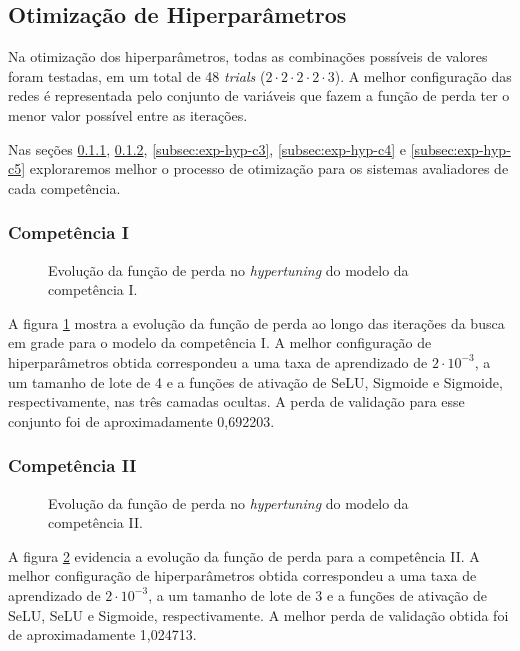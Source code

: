 \subsection{Otimização de Hiperparâmetros}

Na otimização dos hiperparâmetros, todas as combinações possíveis de valores foram testadas, em um total de 48 \textit{trials} ($2 \cdot 2 \cdot 2 \cdot 2 \cdot 3$). A melhor configuração das redes é representada pelo conjunto de variáveis que fazem a função de perda ter o menor valor possível entre as iterações.

Nas seções \ref{subsec:exp-hyp-c1}, \ref{subsec:exp-hyp-c2}, \ref{subsec:exp-hyp-c3}, \ref{subsec:exp-hyp-c4} e \ref{subsec:exp-hyp-c5} exploraremos melhor o processo de otimização para os sistemas avaliadores de cada competência.

\subsubsection{Competência I}
\label{subsec:exp-hyp-c1}

\begin{figure}[H]
    \resizebox{0.5\textwidth}{!}{}
    \caption{Evolução da função de perda no \textit{hypertuning} do modelo da competência I.}
    \label{fig:exp-hyp-c1}
\end{figure}

A figura \ref{fig:exp-hyp-c1} mostra a evolução da função de perda ao longo das iterações da busca em grade para o modelo da competência I. A melhor configuração de hiperparâmetros obtida correspondeu a uma taxa de aprendizado de $2 \cdot 10^{-3}$, a um tamanho de lote de 4 e a funções de ativação de SeLU, Sigmoide e Sigmoide, respectivamente, nas três camadas ocultas. A perda de validação para esse conjunto foi de aproximadamente 0,692203.


\subsubsection{Competência II}
\label{subsec:exp-hyp-c2}

\begin{figure}[H]
    \resizebox{0.5\textwidth}{!}{}
    \caption{Evolução da função de perda no \textit{hypertuning} do modelo da competência II.}
    \label{fig:exp-hyp-c2}
\end{figure}

A figura \ref{fig:exp-hyp-c2} evidencia a evolução da função de perda para a competência II. A melhor configuração de hiperparâmetros obtida correspondeu a uma taxa de aprendizado de $2 \cdot 10^{-3}$, a um tamanho de lote de $3$ e a funções de ativação de SeLU, SeLU e Sigmoide, respectivamente. A melhor perda de validação obtida foi de aproximadamente 1,024713.

